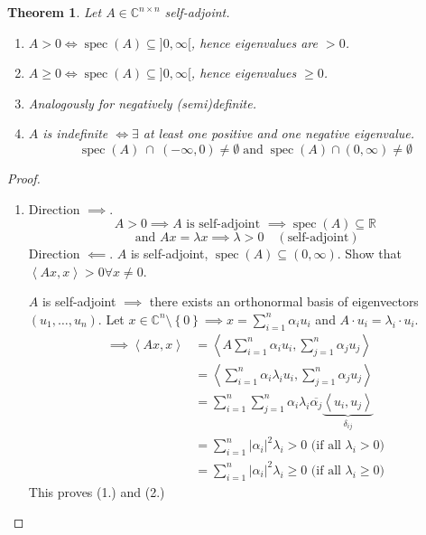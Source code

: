 \documentclass{article}
\newcounter{lecref}[section]
\numberwithin{lecref}{section}
\newtheorem{theorem}[lecref]{Theorem}
\newcommand{\set}[1]{\left\{#1\right\}}
\newcommand{\angel}[1]{\left\langle#1\right\rangle}
\newcommand{\card}[1]{\left|#1\right|}
\begin{document}
\begin{theorem} %
  Let $A \in \mathbb C^{n \times n}$ self-adjoint.
  \begin{enumerate}
    \item $A > 0 \iff \operatorname{spec}(A) \subseteq ]0,\infty[$, hence eigenvalues are $> 0$.
    \item $A \geq 0 \iff \operatorname{spec}(A) \subseteq ]0, \infty[$, hence eigenvalues $\geq 0$.
    \item Analogously for negatively (semi)definite.
    \item $A$ is indefinite $\iff \exists$ at least one positive and one negative eigenvalue.
      \[ \operatorname{spec}(A) \:\cap\: (-\infty,0) \neq \emptyset \operatorname{ and } \operatorname{spec}(A) \cap (0,\infty) \neq \emptyset \]
  \end{enumerate}
\end{theorem}

\begin{proof}
  \begin{enumerate}
    \item Direction $\implies$.
      \[ A > 0 \implies A \text{ is self-adjoint } \implies \operatorname{spec}(A) \subseteq \mathbb R \]
      \[ \text{ and } Ax = \lambda x \implies \lambda > 0 \quad (\text{self-adjoint}) \]
      Direction $\impliedby$.
      $A$ is self-adjoint, $\operatorname{spec}(A) \subseteq (0, \infty)$.
      Show that $\angel{Ax, x} > 0 \forall x \neq 0$.

      $A$ is self-adjoint $\implies$ there exists an orthonormal basis of eigenvectors $(u_1, \dots, u_n)$.
      Let $x \in \mathbb C^n \setminus \set{0} \implies x = \sum_{i=1}^n \alpha_i u_i$ and $A \cdot u_i = \lambda_i \cdot u_i$.
      \begin{align*}
        \implies \angel{Ax,x} &= \angel{A \sum_{i=1}^n \alpha_i u_i, \sum_{j=1}^n \alpha_j u_j} \\
          &= \angel{\sum_{i=1}^n \alpha_i \lambda_i u_i, \sum_{j=1}^n \alpha_j u_j} \\
          &= \sum_{i=1}^n \sum_{j=1}^n \alpha_i \lambda_i \overline{\alpha_j} \underbrace{\angel{u_i,u_j}}_{\delta_{ij}} \\
          &= \sum_{i=1}^n \card{\alpha_i}^2 \lambda_i > 0 \text{ (if all $\lambda_i > 0$)} \\
          &= \sum_{i=1}^n \card{\alpha_i}^2 \lambda_i \geq 0 \text{ (if all $\lambda_i \geq 0$)}
      \end{align*}
      This proves (1.) and (2.)
  \end{enumerate}
\end{proof}
\end{document}
